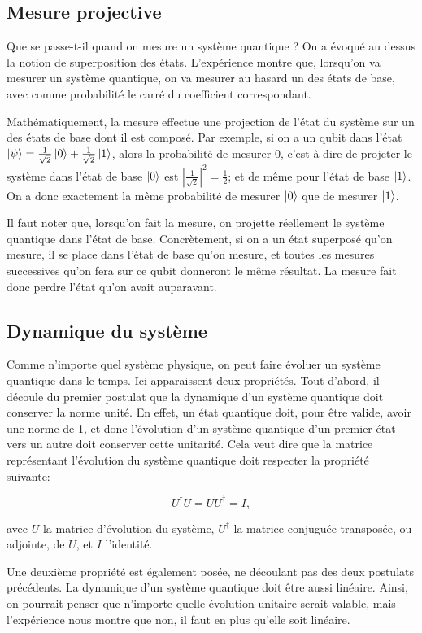\subsection{Mesure projective}
Que se passe-t-il quand on mesure un système quantique ? On a évoqué au dessus la notion de superposition des états. L'expérience montre que, lorsqu'on va mesurer un système quantique, on va mesurer au hasard un des états de base, avec comme probabilité le carré du coefficient correspondant.

Mathématiquement, la mesure effectue une projection de l'état du système sur un des états de base dont il est composé. Par exemple, si on a un qubit dans l'état $\ket{\psi} = \frac{1}{\sqrt{2}}\ket{0} + \frac{1}{\sqrt{2}}\ket{1}$, alors la probabilité de mesurer 0, c'est-à-dire de projeter le système dans l'état de base $\ket{0}$ est $|\frac{1}{\sqrt{2}}|^2 = \frac{1}{2}$; et de même pour l'état de base $\ket{1}$. On a donc exactement la même probabilité de mesurer $\ket{0}$ que de mesurer $\ket{1}$.

Il faut noter que, lorsqu'on fait la mesure, on projette réellement le système quantique dans l'état de base. Concrètement, si on a un état superposé qu'on mesure, il se place dans l'état de base qu'on mesure, et toutes les mesures successives qu'on fera sur ce qubit donneront le même résultat. La mesure fait donc perdre l'état qu'on avait auparavant.

\subsection{Dynamique du système}
Comme n'importe quel système physique, on peut faire évoluer un système quantique dans le temps. Ici apparaissent deux propriétés. Tout d'abord, il découle du premier postulat que la dynamique d'un système quantique doit conserver la norme unité. En effet, un état quantique doit, pour être valide, avoir une norme de 1, et donc l'évolution d'un système quantique d'un premier état vers un autre doit conserver cette unitarité. Cela veut dire que la matrice représentant l'évolution du système quantique doit respecter la propriété suivante:

\begin{equation}
    U^{\dagger}U = UU^{\dagger} = I,
\end{equation}

avec $U$ la matrice d'évolution du système, $U^{\dagger}$ la matrice conjuguée transposée, ou adjointe, de $U$, et $I$ l'identité.

Une deuxième propriété est également posée, ne découlant pas des deux postulats précédents. La dynamique d'un système quantique doit être aussi linéaire. Ainsi, on pourrait penser que n'importe quelle évolution unitaire serait valable, mais l'expérience nous montre que non, il faut en plus qu'elle soit linéaire.
